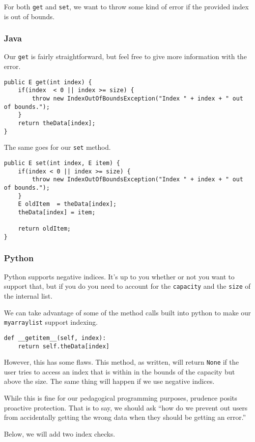 For both \texttt{get} and \texttt{set}, we want to throw some kind of error if the provided index is out of bounds.
\subsubsection{Java}
Our \texttt{get} is fairly straightforward, but feel free to give more information with the error.
\begin{verbatim}
public E get(int index) {
	if(index  < 0 || index >= size) {
		throw new IndexOutOfBoundsException("Index " + index + " out of bounds.");
	}
	return theData[index];
}
\end{verbatim}

The same goes for our \texttt{set} method. 
\begin{verbatim}
public E set(int index, E item) {
	if(index < 0 || index >= size) {
		throw new IndexOutOfBoundsException("Index " + index + " out of bounds.");
	}
	E oldItem  = theData[index];
	theData[index] = item;
	
	return oldItem;
}
\end{verbatim}

\subsubsection{Python}

Python supports negative indices.  It's up to you whether or not you want to support that, but if you do you need to account for the \texttt{capacity} and the \texttt{size} of the internal list.


We can take advantage of some of the method calls built into python to make our \texttt{myarraylist} support indexing.

\begin{verbatim}
def __getitem__(self, index):
	return self.theData[index]
\end{verbatim}

However, this has some flaws.
This method, as written, will return \texttt{None} if the user tries to access an index that is within in the bounds of the capacity but above the size.
The same thing will happen if we use negative indices.

While this is fine for our pedagogical programming purposes, prudence posits proactive protection.  That is to say, we should ask ``how do we prevent out users from accidentally getting the wrong data when they should be getting an error.''

Below, we will add two index checks.

